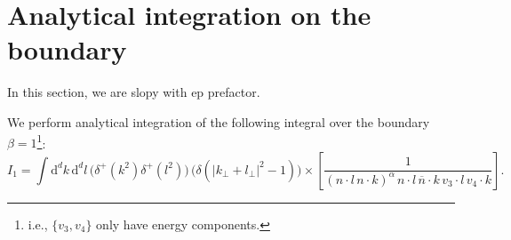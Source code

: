 \documentclass[a4paper,11pt]{article}
\numberwithin{equation}{section}
\newcommand{\dd}{\text{d}}
\newcommand{\ldot}{\!\cdot\!}
\newcommand{\bn}{\overline{n}}
\begin{document}



\newpage
\section{Analytical integration on the boundary }

In this section, we are slopy with ep prefactor. 

We perform analytical integration of the following integral over the 
boundary $\beta=1$\footnote{i.e., $\{v_3,v_4\}$ only have energy components.}: 
\begin{equation}
I_1=  \int  \dd^d k\, \dd^d l\,  	
	\Big( \delta^+(k^2) \delta^+(l^2) \Big) \,            
         \Big(\delta(|k_\perp+l_\perp|^2-1)\Big) 
         \times\left[ \frac1{
            (n \cdot l\, n\cdot k)^{\alpha}\,
            n\ldot l\, \bn\ldot k\,
            v_3\ldot l\, v_4\ldot k} \right]. 
\end{equation}

\end{document}
